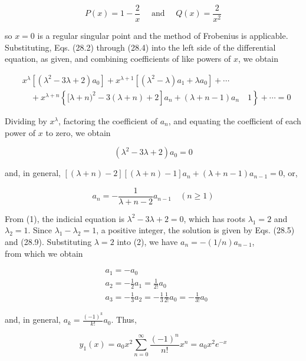 \documentclass[10pt]{article}
\begin{document}
$$
P(x)=1-\frac{2}{x} \quad \text { and } \quad Q(x)=\frac{2}{x^{2}}
$$

so $x=0$ is a regular singular point and the method of Frobenius is applicable. Substituting, Eqs. (28.2) through (28.4) into the left side of the differential equation, as given, and combining coefficients of like powers of $x$, we obtain

$$
\begin{aligned}
& x^{\lambda}\left[\left(\lambda^{2}-3 \lambda+2\right) a_{0}\right]+x^{\lambda+1}\left[\left(\lambda^{2}-\lambda\right) a_{1}+\lambda a_{0}\right]+\cdots \\
& \left.\quad+x^{\lambda+n}\left\{[\lambda+n)^{2}-3(\lambda+n)+2\right] a_{n}+(\lambda+n-1) a_{n} \quad 1\right\}+\cdots=0
\end{aligned}
$$

Dividing by $x^{\lambda}$, factoring the coefficient of $a_{n}$, and equating the coefficient of each power of $x$ to zero, we obtain


\begin{equation*}
\left(\lambda^{2}-3 \lambda+2\right) a_{0}=0 \tag{1}
\end{equation*}


and, in general, $[(\lambda+n)-2][(\lambda+n)-1] a_{n}+(\lambda+n-1) a_{n-1}=0$, or,


\begin{equation*}
a_{n}=-\frac{1}{\lambda+n-2} a_{n-1} \quad(n \geq 1) \tag{2}
\end{equation*}


From (1), the indicial equation is $\lambda^{2}-3 \lambda+2=0$, which has roots $\lambda_{1}=2$ and $\lambda_{2}=1$. Since $\lambda_{1}-\lambda_{2}=1$, a positive integer, the solution is given by Eqs. (28.5) and (28.9). Substituting $\lambda=2$ into (2), we have $a_{n}=-(1 / n) a_{n-1}$,\\
from which we obtain

$$
\begin{aligned}
& a_{1}=-a_{0} \\
& a_{2}=-\frac{1}{2} a_{1}=\frac{1}{2 !} a_{0} \\
& a_{3}=-\frac{1}{3} a_{2}=-\frac{1}{3} \frac{1}{2 !} a_{0}=-\frac{1}{3 !} a_{0}
\end{aligned}
$$

and, in general, $a_{k}=\frac{(-1)^{k}}{k !} a_{0}$. Thus,


\begin{equation*}
y_{1}(x)=a_{0} x^{2} \sum_{n=0}^{\infty} \frac{(-1)^{n}}{n !} x^{n}=a_{0} x^{2} e^{-x} \tag{3}
\end{equation*}
\end{document}
